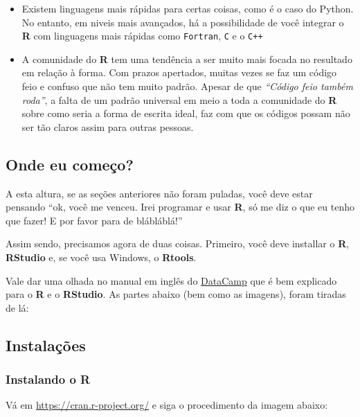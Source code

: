 \documentclass[
]{article}
\begin{document}
\begin{itemize}
\item
  Existem linguagens mais rápidas para certas coisas, como é o caso do
  Python. No entanto, em niveis mais avançados, há a possibilidade de
  você integrar o \textbf{R} com linguagens mais rápidas como
  \texttt{Fortran}, \texttt{C} e o \texttt{C++}
\item
  A comunidade do \textbf{R} tem uma tendência a ser muito mais focada
  no resultado em relação à forma. Com prazos apertados, muitas vezes se
  faz um código feio e confuso que não tem muito padrão. Apesar de que
  \emph{``Código feio também roda''}, a falta de um padrão universal em
  meio a toda a comunidade do \textbf{R} sobre como seria a forma de
  escrita ideal, faz com que os códigos possam não ser tão claros assim
  para outras pessoas.
\end{itemize}

\hypertarget{onde-eu-comeuxe7o}{%
\subsection{Onde eu começo?}\label{onde-eu-comeuxe7o}}

A esta altura, se as seções anteriores não foram puladas, você deve
estar pensando ``ok, você me venceu. Irei programar e usar \textbf{R},
só me diz o que eu tenho que fazer! E por favor para de blábláblá!''

Assim sendo, precisamos agora de duas coisas. Primeiro, você deve
installar o \textbf{R}, \textbf{RStudio} e, se você usa Windows, o
\textbf{Rtools}.

Vale dar uma olhada no manual em inglês do
\href{https://www.datacamp.com/community/tutorials/installing-R-windows-mac-ubuntu}{DataCamp}
que é bem explicado para o \textbf{R} e o \textbf{RStudio}. As partes
abaixo (bem como as imagens), foram tiradas de lá:

\hypertarget{instalauxe7uxf5es}{%
\subsection{Instalações}\label{instalauxe7uxf5es}}

\hypertarget{instalando-o-r}{%
\subsubsection{\texorpdfstring{Instalando o
\textbf{R}}{Instalando o R}}\label{instalando-o-r}}

Vá em \url{https://cran.r-project.org/} e siga o procedimento da imagem
abaixo:
\end{document}
